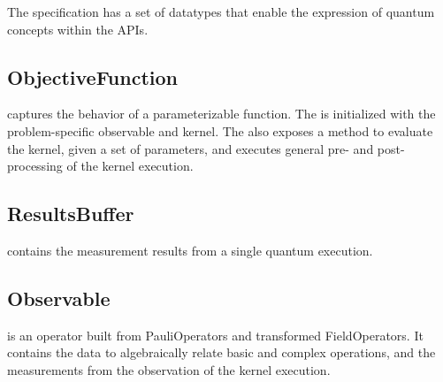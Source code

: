 The \qcor specification has a set of datatypes that enable the expression of quantum concepts within the \qcor \ac{API}s.\\

\subsection{\textbf{ObjectiveFunction}}\label{subsec:ObjectiveFunction}
 captures the behavior of a parameterizable function. The  is initialized with the problem-specific observable and kernel. The  also exposes a method to evaluate the kernel, given a set of parameters, and executes general pre- and post-processing of the kernel execution.\\

\subsection{\textbf{ResultsBuffer}}\label{subsec:ResultsBuffer}
 contains the measurement results from a single quantum execution.\\

\subsection{\textbf{Observable}}\label{subsec:Observable}
 is an operator built from PauliOperators and transformed FieldOperators.
It contains the data to algebraically relate basic and complex operations, 
and the measurements from the observation of the kernel execution.\\


